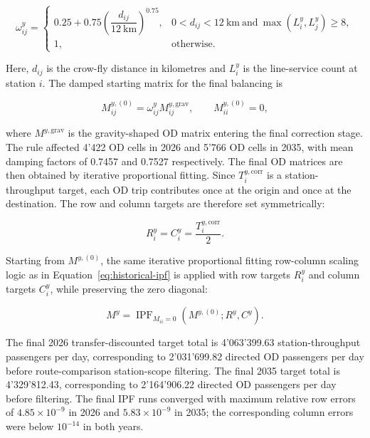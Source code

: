 \documentclass[preprint,12pt]{elsarticle}
\begin{document}
\begin{equation}
\omega_{ij}^y
=
\begin{cases}
0.25+0.75\left(\dfrac{d_{ij}}{12\ \mathrm{km}}\right)^{0.75},
& 0<d_{ij}<12\ \mathrm{km}\ \text{and}\ \max(L_i^y,L_j^y)\ge 8,\\[8pt]
1,
& \text{otherwise}.
\end{cases}
\label{eq:part2-short-urban-damping}
\end{equation}

Here, \(d_{ij}\) is the crow-fly distance in kilometres and \(L_i^y\) is the line-service count at station \(i\). The damped starting matrix for the final balancing is

\begin{equation}
M_{ij}^{y,(0)}=\omega_{ij}^y M_{ij}^{y,\mathrm{grav}},
\qquad
M_{ii}^{y,(0)}=0,
\label{eq:part2-damped-starting-matrix}
\end{equation}

where \(M^{y,\mathrm{grav}}\) is the gravity-shaped OD matrix entering the final correction stage. The rule affected 4'422 OD cells in 2026 and 5'766 OD cells in 2035, with mean damping factors of 0.7457 and 0.7527 respectively. The final OD matrices are then obtained by iterative proportional fitting. Since \(T_i^{y,\mathrm{corr}}\) is a station-throughput target, each OD trip contributes once at the origin and once at the destination. The row and column targets are therefore set symmetrically:

\begin{equation}
R_i^y=C_i^y=\frac{T_i^{y,\mathrm{corr}}}{2}.
\label{eq:part2-row-column-targets}
\end{equation}

Starting from \(M^{y,(0)}\), the same iterative proportional fitting row-column scaling logic as in Equation~\eqref{eq:historical-ipf} is applied with row targets \(R_i^y\) and column targets \(C_i^y\), while preserving the zero diagonal:

\begin{equation}
M^y
=
\operatorname{IPF}_{M_{ii}=0}\left(M^{y,(0)};R^y,C^y\right).
\label{eq:part2-final-ipf}
\end{equation}

The final 2026 transfer-discounted target total is 4'063'399.63 station-throughput passengers per day, corresponding to 2'031'699.82 directed OD passengers per day before route-comparison station-scope filtering. The final 2035 target total is 4'329'812.43, corresponding to 2'164'906.22 directed OD passengers per day before filtering. The final IPF runs converged with maximum relative row errors of \(4.85\times10^{-9}\) in 2026 and \(5.83\times10^{-9}\) in 2035; the corresponding column errors were below \(10^{-14}\) in both years.
\end{document}
